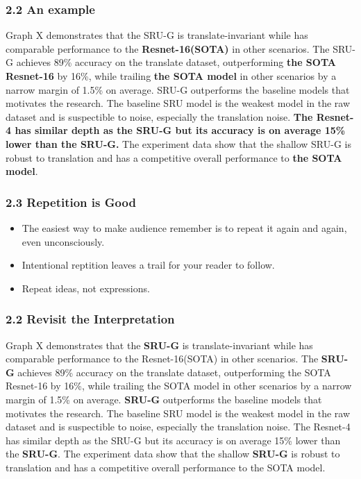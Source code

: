 \documentclass{beamer}
\begin{document}
    \begin{frame}
    \frametitle{2.2 An example}
    Graph X demonstrates that the SRU-G is translate-invariant while has comparable performance to the \textbf{Resnet-16(SOTA)} in other scenarios.
    The SRU-G achieves 89\% accuracy on the translate dataset, outperforming \textbf{the SOTA Resnet-16} by 16\%, while trailing \textbf{the SOTA model} in other scenarios by a narrow margin of 1.5\% on average.
    SRU-G outperforms the baseline models that motivates the research. The baseline SRU model is the weakest model in the raw dataset and is suspectible to noise, especially the translation noise. \textbf{The Resnet-4 has similar depth as the SRU-G but its accuracy is on average 15\% lower than the SRU-G.}
    The experiment data show that the shallow SRU-G is robust to translation and has a competitive overall performance to \textbf{the SOTA model}.
    \end{frame}
    
    
    \begin{frame}
        \frametitle{2.3 Repetition is Good}
        \begin{itemize}
            \item The easiest way to make audience remember is to repeat it again and again, even unconsciously.
            \item Intentional reptition leaves a trail for your reader to follow.
            \item Repeat ideas, not expressions.
        \end{itemize}
    \end{frame}
    
    \begin{frame}
        \frametitle{2.2 Revisit the Interpretation}
        Graph X demonstrates that the \textbf{SRU-G} is translate-invariant while has comparable performance to the Resnet-16(SOTA) in other scenarios.
        The \textbf{SRU-G} achieves 89\% accuracy on the translate dataset, outperforming the SOTA Resnet-16 by 16\%, while trailing the SOTA model in other scenarios by a narrow margin of 1.5\% on average.
        \textbf{SRU-G} outperforms the baseline models that motivates the research. The baseline SRU model is the weakest model in the raw dataset and is suspectible to noise, especially the translation noise. The Resnet-4 has similar depth as the SRU-G but its accuracy is on average 15\% lower than the \textbf{SRU-G}.
        The experiment data show that the shallow \textbf{SRU-G} is robust to translation and has a competitive overall performance to the SOTA model.
        \end{frame}
    
\end{document}
